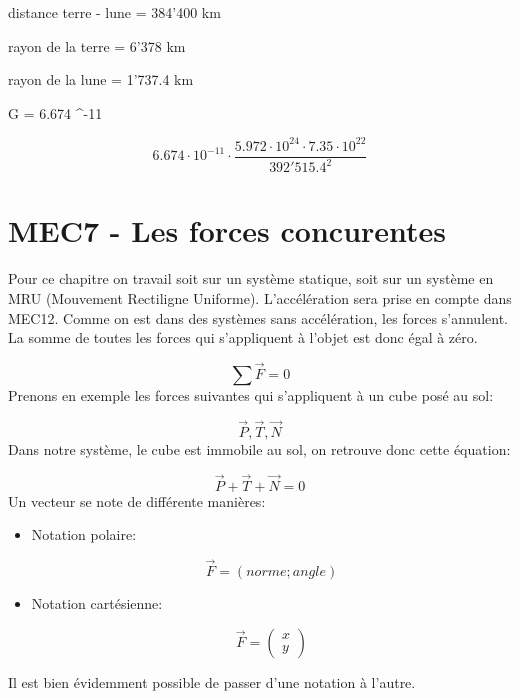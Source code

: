 \documentclass{article}
\begin{document}
distance terre - lune = 384'400 km

rayon de la terre = 6'378 km

rayon de la lune = 1'737.4 km

G = 6.674 ^{-11}

\begin{equation}
  6.674 \cdot 10^{-11} \cdot \frac{5.972 \cdot 10^{24} \cdot 7.35 \cdot 10^{22}}{392'515.4^2}
\end{equation}


\section{MEC7 - Les forces concurentes}

Pour ce chapitre on travail soit sur un système statique, soit sur un système en MRU (Mouvement Rectiligne Uniforme).
L'accélération sera prise en compte dans MEC12.
\newline
\newline
Comme on est dans des systèmes sans accélération, les forces s'annulent.
La somme de toutes les forces qui s'appliquent à l'objet est donc égal à zéro.

\begin{equation}
  \sum\vec{F} = 0
\end{equation}
\newline
Prenons en exemple les forces suivantes qui s'appliquent à un cube posé au sol:
\newline

\begin{equation}
\vec{P}, \vec{T}, \vec{N}
\end{equation}
\newline
Dans notre système, le cube est immobile au sol, on retrouve donc cette équation:

\begin{equation}
  \vec{P} + \vec{T} + \vec{N} = 0
\end{equation}
\newline
Un vecteur se note de différente manières:

\begin{itemize}
  \item Notation polaire:

    \begin{equation}
      \vec{F} = (norme ; angle)
    \end{equation}
  
  \item Notation cartésienne:
   
    \begin{equation}
      \vec{F} = 
      \begin{pmatrix}
        x \\
        y
      \end{pmatrix}
    \end{equation}

\end{itemize}
\newline
Il est bien évidemment possible de passer d'une notation à l'autre.
\end{document}
